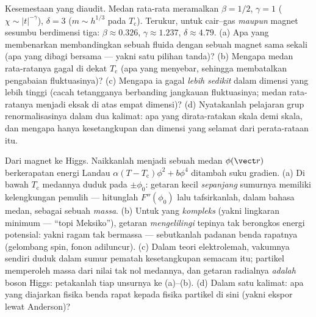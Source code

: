 \begin{exercise}[$\star\star\star$]\label{exo:b3:phase-transitions:11}
Kesemestaan yang diaudit. Medan rata-rata meramalkan $\beta = 1/2$, $\gamma
= 1$ ($\chi \sim |t|^{-\gamma}$), $\delta = 3$ ($m \sim h^{1/3}$
pada $T_{\text{c}}$). Terukur, untuk  cair--gas
\emph{maupun} magnet sesumbu berdimensi tiga: $\beta
\approx 0.326$, $\gamma \approx 1.237$, $\delta \approx 4.79$.
(a) Apa yang membenarkan membandingkan sebuah fluida dengan sebuah magnet
sama sekali (apa yang dibagi bersama  --- yakni
satu pilihan tanda)? (b)
Mengapa medan rata-ratanya gagal di dekat $T_{\text{c}}$ (apa yang
menyebar, sehingga membatalkan pengabaian fluktuasinya)? (c) Mengapa ia
gagal \emph{lebih sedikit} dalam dimensi yang lebih tinggi (cacah
tetangganya berbanding jangkauan fluktuasinya; medan rata-ratanya menjadi
eksak di atas empat
dimensi)? (d) Nyatakanlah pelajaran grup renormalisasinya dalam dua
kalimat: apa yang dirata-ratakan skala demi skala, dan mengapa hanya
kesetangkupan dan dimensi yang selamat dari perata-rataan itu.
\end{exercise}

\begin{exercise}[$\star\star\star$]\label{exo:b3:phase-transitions:12}
Dari magnet ke Higgs. Naikkanlah  menjadi sebuah
medan $\phi(\vect r)$ berkerapatan energi Landau $\alpha(T -
T_{\text{c}})\phi^2 + b\phi^4$ ditambah suku gradien. (a) Di bawah
$T_{\text{c}}$ medannya duduk pada $\pm\phi_0$: getaran kecil
\emph{sepanjang} sumurnya memiliki kelengkungan pemulih --- hitunglah
$F''(\phi_0)$ lalu tafsirkanlah, dalam bahasa medan, sebagai sebuah
\emph{massa}. (b) Untuk  yang \emph{kompleks} (yakni
lingkaran minimum --- ``topi Meksiko''), getaran \emph{mengelilingi}
tepinya tak berongkos energi potensial: yakni ragam tak bermassa ---
sebutkanlah padanan benda rapatnya (gelombang spin, fonon adiluncur). (c)
Dalam teori elektrolemah, vakumnya sendiri duduk dalam sumur pematah
kesetangkupan semacam itu; partikel memperoleh massa dari nilai tak nol
medannya, dan getaran radialnya \emph{adalah} boson
Higgs: petakanlah tiap unsurnya ke (a)--(b). (d) Dalam satu kalimat: apa
yang diajarkan fisika benda rapat kepada fisika partikel di sini (yakni
ekspor  lewat Anderson)?
\end{exercise}

